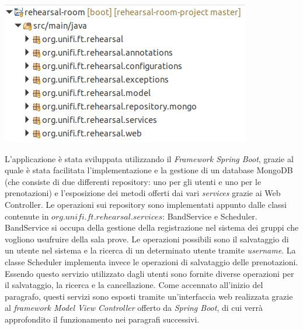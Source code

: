 \begin{minipage}{\linewidth}
	\includegraphics[width=\textwidth]{img/packages.png}
\end{minipage}
\newline

L'applicazione è stata sviluppata utilizzando il \textsl{Framework Spring Boot}, grazie al quale è stata facilitata l'implementazione e la gestione di un database MongoDB (che consiste di due differenti repository: uno per gli utenti e uno per le prenotazioni) e l'esposizione dei metodi offerti dai vari \textsl{services} grazie ai Web Controller.\newline\newline
Le operazioni sui repository sono implementati appunto dalle classi contenute in $org.unifi.ft.rehearsal.services$: BandService e Scheduler.\newline
BandService si occupa della gestione della registrazione nel sistema dei gruppi che vogliono usufruire della sala prove. Le operazioni possibili sono il salvataggio di un utente nel sistema e la ricerca di un determinato utente tramite \textsl{username}.\newline
La classe Scheduler implementa invece le operazioni di salvataggio delle prenotazioni. Essendo questo servizio utilizzato dagli utenti sono fornite diverse operazioni per il salvataggio, la ricerca e la cancellazione.\newline\newline
Come accennato all'inizio del paragrafo, questi servizi sono esposti tramite un'interfaccia web realizzata grazie al \textsl{framework Model View Controller} offerto da \textsl{Spring Boot}, di cui verrà approfondito il funzionamento nei paragrafi successivi.